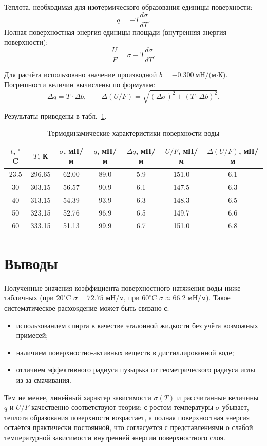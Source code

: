 \documentclass[a4paper]{article}
\begin{document}
	Теплота, необходимая для изотермического образования единицы поверхности:
	\[
	q = -T \frac{d\sigma}{dT}.
	\]
	Полная поверхностная энергия единицы площади (внутренняя энергия поверхности):
	\[
	\frac{U}{F} = \sigma - T \frac{d\sigma}{dT}.
	\]
	
	Для расчёта использовано значение производной \(b = -0.300\ \text{мН/(м·К)}\).
	Погрешности величин вычислены по формулам:
	\[
	\Delta q = T \cdot \Delta b,\qquad
	\Delta(U/F) = \sqrt{(\Delta\sigma)^2 + (T \cdot \Delta b)^2}.
	\]
	
	Результаты приведены в табл.~\ref{tab:thermo}.
	
	\begin{table}[h!]
		\centering
		\caption{Термодинамические характеристики поверхности воды}
		\label{tab:thermo}
		\begin{tabular}{|c|c|c|c|c|c|c|}
			\hline
			\(t\), \(^\circ\)C & \(T\), К & \(\sigma\), мН/м & \(q\), мН/м & \(\Delta q\), мН/м & \(U/F\), мН/м & \(\Delta(U/F)\), мН/м \\
			\hline
			23.5 & 296.65 & 62.00 & 89.0 & 5.9 & 151.0 & 6.1 \\
			30   & 303.15 & 56.57 & 90.9 & 6.1 & 147.5 & 6.3 \\
			40   & 313.15 & 54.39 & 93.9 & 6.3 & 148.3 & 6.5 \\
			50   & 323.15 & 52.76 & 96.9 & 6.5 & 149.7 & 6.6 \\
			60   & 333.15 & 51.13 & 99.9 & 6.7 & 151.0 & 6.8 \\
			\hline
		\end{tabular}
	\end{table}
	
	
	\section{Выводы}
		Полученные значения коэффициента поверхностного натяжения воды ниже табличных
	(при \(20^\circ\text{C}\) \(\sigma = 72.75\) мН/м, при \(60^\circ\text{C}\) \(\sigma \approx 66.2\) мН/м).
	Такое систематическое расхождение может быть связано с:
	\begin{itemize}
		\item использованием спирта в качестве эталонной жидкости без учёта возможных примесей;
		\item наличием поверхностно-активных веществ в дистиллированной воде;
		\item отличием эффективного радиуса пузырька от геометрического радиуса иглы из-за смачивания.
	\end{itemize}
	Тем не менее, линейный характер зависимости \(\sigma(T)\) и рассчитанные величины \(q\) и \(U/F\)
	качественно соответствуют теории: с ростом температуры \(\sigma\) убывает, теплота образования
	поверхности возрастает, а полная поверхностная энергия остаётся практически постоянной,
	что согласуется с представлениями о слабой температурной зависимости внутренней энергии
	поверхностного слоя.
	\newpage
\end{document}
